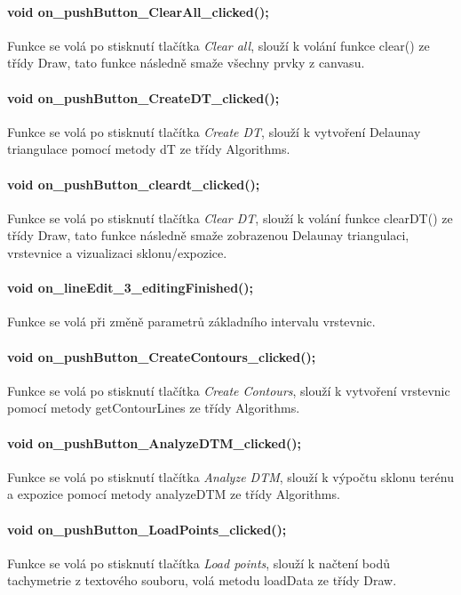 \documentclass[11pt]{article}
\begin{document}
\paragraph {void on\_pushButton\_ClearAll\_clicked();}
Funkce se volá po stisknutí tlačítka \textit{Clear all}, slouží k volání funkce clear() ze třídy Draw, tato funkce následně smaže všechny prvky z canvasu.

\paragraph {void on\_pushButton\_CreateDT\_clicked();}
Funkce se volá po stisknutí tlačítka \textit{Create DT}, slouží k vytvoření Delaunay triangulace pomocí metody dT ze třídy Algorithms.

\paragraph {void on\_pushButton\_cleardt\_clicked();}
Funkce se volá po stisknutí tlačítka \textit{Clear DT}, slouží k volání funkce clearDT() ze třídy Draw, tato funkce následně smaže zobrazenou Delaunay triangulaci, vrstevnice a vizualizaci sklonu/expozice.

\paragraph {void on\_lineEdit\_3\_editingFinished();}
Funkce se volá při změně parametrů základního intervalu vrstevnic.

\paragraph {void on\_pushButton\_CreateContours\_clicked();}
Funkce se volá po stisknutí tlačítka \textit{Create Contours}, slouží k vytvoření vrstevnic pomocí metody getContourLines ze třídy Algorithms.


\paragraph {void on\_pushButton\_AnalyzeDTM\_clicked();}
Funkce se volá po stisknutí tlačítka \textit{Analyze DTM}, slouží k výpočtu sklonu terénu a expozice pomocí metody analyzeDTM ze třídy Algorithms.

\paragraph {void on\_pushButton\_LoadPoints\_clicked();}
Funkce se volá po stisknutí tlačítka \textit{Load points}, slouží k načtení bodů tachymetrie z textového souboru, volá metodu loadData ze třídy Draw.
\end{document}
